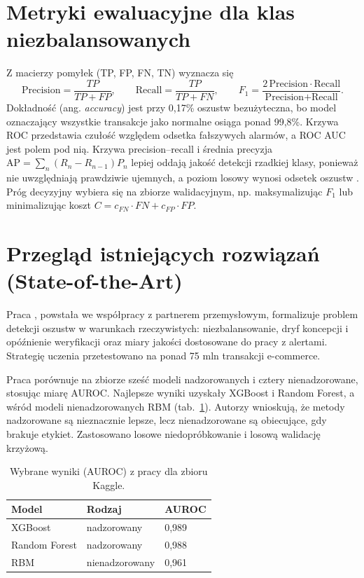 \section{Metryki ewaluacyjne dla klas niezbalansowanych}
Z macierzy pomyłek (TP, FP, FN, TN) wyznacza się
\begin{equation}
  \text{Precision}=\frac{TP}{TP+FP},\qquad \text{Recall}=\frac{TP}{TP+FN},\qquad F_1=\frac{2\,\text{Precision}\cdot\text{Recall}}{\text{Precision}+\text{Recall}}.
\end{equation}
Dokładność (ang. \emph{accuracy}) jest przy 0{,}17\% oszustw bezużyteczna, bo model oznaczający wszystkie transakcje jako normalne osiąga ponad 99{,}8\%. Krzywa ROC przedstawia czułość względem odsetka fałszywych alarmów, a ROC AUC jest polem pod nią. Krzywa precision--recall i średnia precyzja $\text{AP}=\sum_n(R_n-R_{n-1})P_n$ lepiej oddają jakość detekcji rzadkiej klasy, ponieważ nie uwzględniają prawdziwie ujemnych, a poziom losowy wynosi odsetek oszustw \cite{saito2015}. Próg decyzyjny wybiera się na zbiorze walidacyjnym, np. maksymalizując $F_1$ lub minimalizując koszt $C=c_{FN}\cdot FN+c_{FP}\cdot FP$.

\section{Przegląd istniejących rozwiązań (State-of-the-Art)}
Praca \cite{dalpozzolo2018}, powstała we współpracy z partnerem przemysłowym, formalizuje problem detekcji oszustw w warunkach rzeczywistych: niezbalansowanie, dryf koncepcji i opóźnienie weryfikacji oraz miary jakości dostosowane do pracy z alertami. Strategię uczenia przetestowano na ponad 75 mln transakcji e-commerce.

Praca \cite{niu2019} porównuje na zbiorze \cite{kaggle_ulb} sześć modeli nadzorowanych i cztery nienadzorowane, stosując miarę AUROC. Najlepsze wyniki uzyskały XGBoost i Random Forest, a wśród modeli nienadzorowanych RBM (tab.~\ref{tab:niu}). Autorzy wnioskują, że metody nadzorowane są nieznacznie lepsze, lecz nienadzorowane są obiecujące, gdy brakuje etykiet. Zastosowano losowe niedopróbkowanie i losową walidację krzyżową.

\begin{table}[H]
\centering
\caption{Wybrane wyniki (AUROC) z pracy \cite{niu2019} dla zbioru Kaggle.}
\label{tab:niu}
\begin{tabular}{lll}
\toprule
Model & Rodzaj & AUROC \\
\midrule
XGBoost & nadzorowany & 0{,}989 \\
Random Forest & nadzorowany & 0{,}988 \\
RBM & nienadzorowany & 0{,}961 \\
\bottomrule
\end{tabular}\\[4pt]
\end{table}


